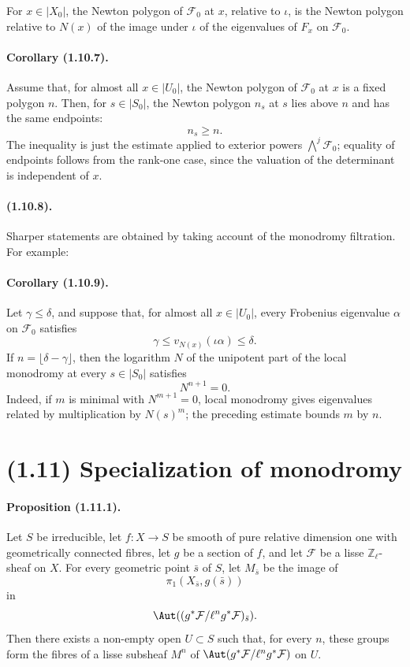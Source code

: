 For $x\in |X_0|$, the Newton polygon of $\mathcal F_0$ at $x$, relative to $\iota$, is the Newton polygon relative to $N(x)$ of the image under $\iota$ of the eigenvalues of $F_x$ on $\mathcal F_0$.

\paragraph{Corollary (1.10.7).}
Assume that, for almost all $x\in |U_0|$, the Newton polygon of $\mathcal F_0$ at $x$ is a fixed polygon $n$. Then, for $s\in |S_0|$, the Newton polygon $n_s$ at $s$ lies above $n$ and has the same endpoints:
\[
  n_s\geq n.
\]
The inequality is just the estimate applied to exterior powers $\bigwedge^j\mathcal F_0$; equality of endpoints follows from the rank-one case, since the valuation of the determinant is independent of $x$.

\paragraph{(1.10.8).}
Sharper statements are obtained by taking account of the monodromy filtration. For example:

\paragraph{Corollary (1.10.9).}
Let $\gamma\leq\delta$, and suppose that, for almost all $x\in |U_0|$, every Frobenius eigenvalue $\alpha$ on $\mathcal F_0$ satisfies
\[
  \gamma\leq v_{N(x)}(\iota\alpha)\leq \delta.
\]
If $n=\lfloor\delta-\gamma\rfloor$, then the logarithm $N$ of the unipotent part of the local monodromy at every $s\in |S_0|$ satisfies
\[
  N^{n+1}=0.
\]
Indeed, if $m$ is minimal with $N^{m+1}=0$, local monodromy gives eigenvalues related by multiplication by $N(s)^m$; the preceding estimate bounds $m$ by $n$.

\section*{(1.11) Specialization of monodromy}

\paragraph{Proposition (1.11.1).}
Let $S$ be irreducible, let $f:X\to S$ be smooth of pure relative dimension one with geometrically connected fibres, let $g$ be a section of $f$, and let $\mathcal F$ be a lisse $\mathbb Z_\ell$-sheaf on $X$. For every geometric point $\bar s$ of $S$, let $M_{\bar s}$ be the image of
\[
  \pi_1(X_{\bar s},g(\bar s))
\]
in
\[
  \Aut((g^*\mathcal F/\ell^n g^*\mathcal F)_{\bar s}).
\]
Then there exists a non-empty open $U\subset S$ such that, for every $n$, these groups form the fibres of a lisse subsheaf $M^n$ of $\Aut(g^*\mathcal F/\ell^n g^*\mathcal F)$ on $U$.

